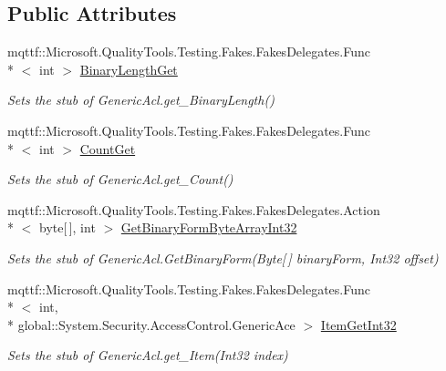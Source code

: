 \subsection*{Public Attributes}
\begin{DoxyCompactItemize}
\item 
mqttf\-::\-Microsoft.\-Quality\-Tools.\-Testing.\-Fakes.\-Fakes\-Delegates.\-Func\\*
$<$ int $>$ \hyperlink{class_system_1_1_security_1_1_access_control_1_1_fakes_1_1_stub_generic_acl_abacad6ce30a6b464cd58fb5358040c51}{Binary\-Length\-Get}
\begin{DoxyCompactList}\small\item\em Sets the stub of Generic\-Acl.\-get\-\_\-\-Binary\-Length()\end{DoxyCompactList}\item 
mqttf\-::\-Microsoft.\-Quality\-Tools.\-Testing.\-Fakes.\-Fakes\-Delegates.\-Func\\*
$<$ int $>$ \hyperlink{class_system_1_1_security_1_1_access_control_1_1_fakes_1_1_stub_generic_acl_a1d35d17843d159fb715241fbe6bea973}{Count\-Get}
\begin{DoxyCompactList}\small\item\em Sets the stub of Generic\-Acl.\-get\-\_\-\-Count()\end{DoxyCompactList}\item 
mqttf\-::\-Microsoft.\-Quality\-Tools.\-Testing.\-Fakes.\-Fakes\-Delegates.\-Action\\*
$<$ byte\mbox{[}$\,$\mbox{]}, int $>$ \hyperlink{class_system_1_1_security_1_1_access_control_1_1_fakes_1_1_stub_generic_acl_ae4a8e8e4e7189dcbf5aba3d132b0bec9}{Get\-Binary\-Form\-Byte\-Array\-Int32}
\begin{DoxyCompactList}\small\item\em Sets the stub of Generic\-Acl.\-Get\-Binary\-Form(\-Byte\mbox{[}$\,$\mbox{]} binary\-Form, Int32 offset)\end{DoxyCompactList}\item 
mqttf\-::\-Microsoft.\-Quality\-Tools.\-Testing.\-Fakes.\-Fakes\-Delegates.\-Func\\*
$<$ int, \\*
global\-::\-System.\-Security.\-Access\-Control.\-Generic\-Ace $>$ \hyperlink{class_system_1_1_security_1_1_access_control_1_1_fakes_1_1_stub_generic_acl_a91f5e476e5158fd55b4a3859962d1212}{Item\-Get\-Int32}
\begin{DoxyCompactList}\small\item\em Sets the stub of Generic\-Acl.\-get\-\_\-\-Item(\-Int32 index)\end{DoxyCompactList}\item 

\end{DoxyCompactItemize}
